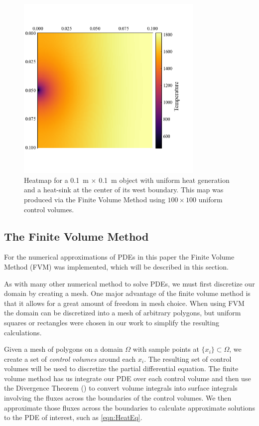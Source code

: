 \begin{figure}
	\centering
	\includegraphics[width=0.8\textwidth]{Chapter_I_Background/Images/Heatmap_Example.png}
	\caption[Heatmap Example]{Heatmap for a \SI{0.1}{\meter} $\times$ \SI{0.1}{\meter} object with uniform heat generation and a heat-sink at the center of its west boundary. This map was produced via the Finite Volume Method using $100\times 100$ uniform control volumes.}
	\label{fig:heatmap-example}
\end{figure}

\subsection{The Finite Volume Method}\label{sec:FVM}

For the numerical approximations of PDEs in this paper the Finite Volume Method (FVM) was implemented, which will be described in this section.

As with many other numerical method to solve PDEs, we must first discretize our domain by creating a mesh. One major advantage of the finite volume method is that it allows for a great amount of freedom in mesh choice. When using FVM the domain can be discretized into a mesh of arbitrary polygons, but uniform squares or rectangles were chosen in our work to simplify the resulting calculations.

Given a mesh of polygons on a domain $\Omega$ with sample points at $\lbrace x_i\rbrace\subset\Omega$, we create a set of \textit{control volumes} around each $x_i$. The resulting set of control volumes will be used to discretize the partial differential equation. The finite volume method has us integrate our PDE over each control volume and then use the Divergence Theorem () to convert volume integrals into surface integrals involving the fluxes across the boundaries of the control volumes. We then approximate those fluxes across the boundaries to calculate approximate solutions to the PDE of interest, such as \eqref{eqn:HeatEq}.

